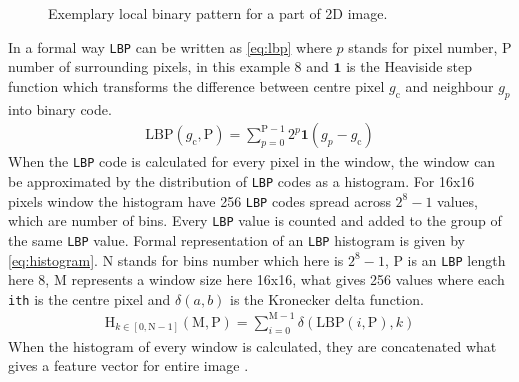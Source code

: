 \begin{figure}[H]
	\begin{center}
	\end{center}
	\caption{Exemplary local binary pattern for a part of 2D image.}

	\label{fig:LBP_2_D}
\end{figure}
In a formal way \verb|LBP| can be written as \ref{eq:lbp} where $p$ stands for pixel number, P number of surrounding pixels, in this example 8 and $\mathbf{1}$ is the Heaviside step function which transforms the difference between centre pixel $g_\mathrm{c}$ and neighbour $g_p$ into binary code.
\begin{equation} \label{eq:lbp}
\begin{aligned}
\text{LBP}(g_\mathrm{c}, \mathrm{P})=\sum_{p=0}^{\mathrm{P}-1} 2^p\mathbf{1}(g_p-g_\mathrm{c})
\end{aligned}
\end{equation}
When the \verb|LBP| code is calculated for every pixel in the window, the window can be approximated by the distribution of \verb|LBP| codes as a histogram. For 16x16 pixels window the histogram have 256 \verb|LBP| codes spread across $2^8-1$ values, which are number of
bins. Every \verb|LBP| value is counted and added to the group of the same \verb|LBP| value. Formal representation of an \verb|LBP| histogram is given by \ref{eq:histogram}. N stands for bins number which here is $2^8-1$, P is an \verb|LBP| length here 8, M represents a window size here 16x16, what gives 256 values where each \verb|ith| is the centre pixel and $\delta(a,b)$ is the Kronecker delta function.
\begin{equation} \label{eq:histogram}
\begin{aligned}
\mathrm{H}_{k\in[0, \mathrm{N}-1]}(\mathrm{M}, \mathrm{P}) = \sum_{i=0}^{\mathrm{M}-1} \delta(\mathrm{LBP}(i, \mathrm{P}), k)
\end{aligned}
\end{equation}
When the histogram of every window is calculated, they are concatenated what gives a feature vector for entire image \cite{lbp_facial}.
